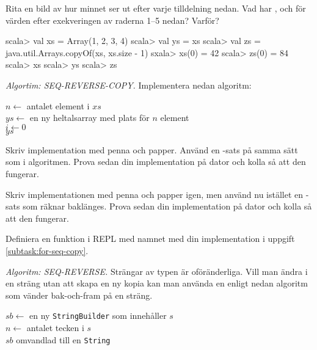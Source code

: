 \Subtask\Pen Rita en bild av hur minnet ser ut efter varje tilldelning nedan. Vad har ,  och  för värden efter exekveringen av raderna 1--5 nedan? Varför? 
\begin{REPL}
scala> val xs = Array(1, 2, 3, 4)
scala> val ys = xs
scala> val zs = java.util.Arrays.copyOf(xs, xs.size - 1)
sxala> xs(0) = 42
scala> zs(0) = 84
scala> xs
scala> ys
scala> zs
\end{REPL}

\Task \emph{Algortim: SEQ-REVERSE-COPY.} Implementera nedan algoritm:

\begin{algorithm}[H]
 
 $n \leftarrow$ antalet element i $xs$ \\
 $ys \leftarrow$ en ny heltalsarray med plats för $n$ element\\
 $i \leftarrow 0$  \\
 \Return $ys$
\end{algorithm}

\Subtask\Pen Skriv implementation med penna och papper. Använd en -sats på samma sätt som i algoritmen. Prova sedan din implementation på dator och kolla så att den fungerar.

\Subtask\Pen \label{subtask:for-seq-copy} Skriv implementationen med penna och papper igen, men använd nu istället en -sats som räknar baklänges. Prova sedan din implementation på dator och kolla så att den fungerar. 

\Subtask Definiera en funktion i REPL med namnet  med din implementation i uppgift \ref{subtask:for-seq-copy}.  


\Task \emph{Algoritm: SEQ-REVERSE.} Strängar av typen  är oföränderliga. Vill man ändra i en sträng utan att skapa en ny kopia kan man använda en  enligt nedan algoritm som vänder bak-och-fram på en sträng. 

\begin{algorithm}[H]
 
 $sb \leftarrow$ en ny \texttt{StringBuilder} som innehåller $s$ \\
 $n \leftarrow$ antalet tecken i $s$\\
 \Return $sb$ omvandlad till en \texttt{String}
\end{algorithm}

